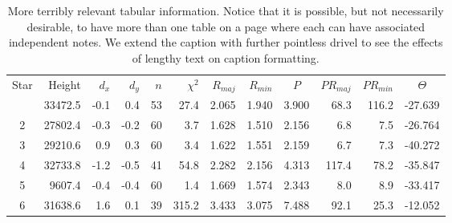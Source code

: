 \clearpage

\begin{table*}
\begin{center}
\begin{tabular}{crrrrrrrrrrr}
Star & Height & $d_{x}$ & $d_{y}$ & $n$ & $\chi^2$ & $R_{maj}$ & $R_{min}$ &
\multicolumn{1}{c}{$P$\tablenotemark{t}} & $P R_{maj}$ & $P R_{min}$ & 
\multicolumn{1}{c}{$\Theta$\tablenotemark{u}} \\
\tableline
1 &33472.5 &-0.1 &0.4  &53 &27.4 &2.065  &1.940 &3.900 &68.3 &116.2 &-27.639\\
2 &27802.4 &-0.3 &-0.2 &60 &3.7  &1.628  &1.510 &2.156 &6.8  &7.5 &-26.764\\
3 &29210.6 &0.9  &0.3  &60 &3.4  &1.622  &1.551 &2.159 &6.7  &7.3 &-40.272\\
4 &32733.8 &-1.2\tablenotemark{v} &-0.5 &41 &54.8 &2.282  &2.156 &4.313 &117.4 &78.2 &-35.847\\
5 & 9607.4 &-0.4 &-0.4 &60 &1.4  &1.669\tablenotemark{v}  &1.574 &2.343 &8.0  &8.9 &-33.417\\
6 &31638.6 &1.6  &0.1  &39 &315.2 & 3.433 &3.075 &7.488 &92.1 &25.3 &-12.052\\
\end{tabular}
\end{center}



\caption{
More terribly relevant tabular information.  Notice that it is possible, but
not necessarily desirable, to have more than one table on a page where 
each can have associated
independent notes.  We extend the caption with
further pointless drivel to see the effects of lengthy text on
caption formatting. \label{tbl-2}}


\end{table*}

